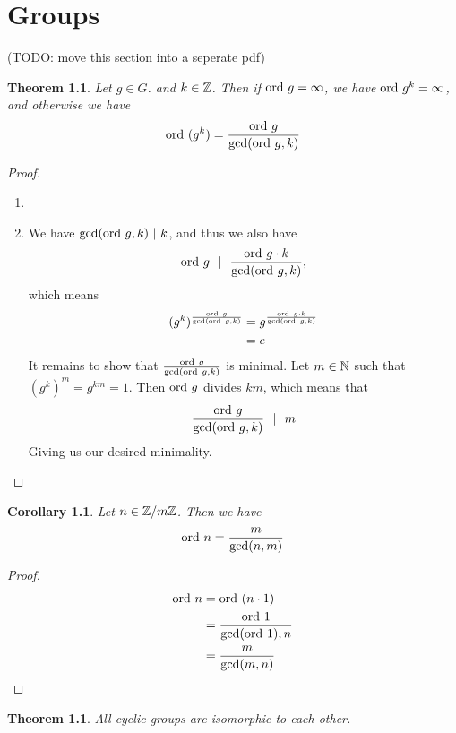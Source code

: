 \documentclass[10pt]{report}
\newtheorem{theorem}[lemma]{Theorem}
\newtheorem{corollary}[lemma]{Corollary}
\theoremstyle{definition}
\begin{document}
	
	\tableofcontents
	\chapter{Groups}
	(TODO: move this section into a seperate pdf)
	\begin{theorem}
		Let $g \in G$. and $k \in \mathbb{Z}$. Then if $\textnormal{ord}\  g = \infty$, we have $\textnormal{ord}\  g^k = \infty$, and otherwise we have
		\begin{align*}
			\textnormal{ord}\ (g^k) = \frac{\textnormal{ord}\  g}{\gcd(\textnormal{ord}\  g,k)}
		\end{align*}
	\end{theorem}
	\begin{proof}
		\begin{enumerate}
			\item 
			\item We have $\gcd(\textnormal{ord}\  g,k) ~|~ k$, and thus we also have
			\begin{align*}
				\textnormal{ord}\  g ~~|~~ \frac{\textnormal{ord}\  g \cdot k}{\gcd(\textnormal{ord}\  g,k)},
			\end{align*}
			which means
			\begin{align*}
				(g^k)^\frac{\textnormal{ord}\  g}{\gcd(\textnormal{ord}\  g,k)} &= g^\frac{\textnormal{ord}\  g \cdot k}{\gcd(\textnormal{ord}\  g,k)}\\
				&= e
			\end{align*}
			It remains to show that $\frac{\textnormal{ord}\  g}{\gcd(\textnormal{ord}\  g,k)}$ is minimal. Let $m \in \mathbb{N}$ such that $(g^k)^m = g^{km} = 1$. Then $\textnormal{ord}\  g$ divides $km$, which means that 
			\begin{align*}
				\frac{\textnormal{ord}\  g}{\gcd(\textnormal{ord}\  g,k)} ~~|~~ m
			\end{align*}
			Giving us our desired minimality.
		\end{enumerate}
	\end{proof}
	\begin{corollary}
		Let $n \in \mathbb{Z}/m\mathbb{Z}$. Then we have
		\begin{align*}
			\textnormal{ord}\  n = \frac{m}{\gcd(n,m)}
		\end{align*}
	\end{corollary}
	\begin{proof}
		\begin{align*}
			\textnormal{ord}\  n 
			&= \textnormal{ord}\ (n \cdot 1)\\
			&= \frac{\textnormal{ord}\  1}{\gcd(\textnormal{ord}\  1),n}\\
			&= \frac{m}{\gcd(m,n)}
		\end{align*}
	\end{proof}
	\begin{theorem}
		All cyclic groups are isomorphic to each other.
	\end{theorem}
\end{document}
